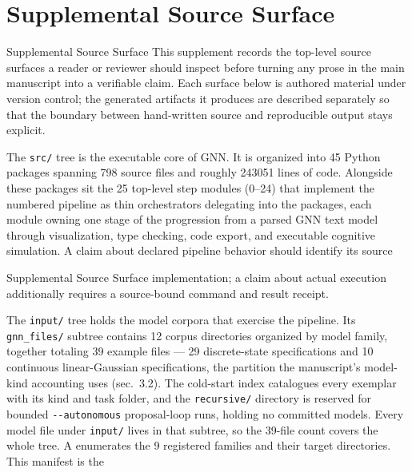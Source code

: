\documentclass[
  ignorenonframetext,
]{beamer}
\author{\texorpdfstring{}{}}
\date{}
\begin{document}
\section{Supplemental Source Surface}\label{sec:source_surface}

\begin{frame}{Supplemental Source Surface}
This supplement records the top-level source surfaces a reader or
reviewer should inspect before turning any prose in the main manuscript
into a verifiable claim. Each surface below is authored material under
version control; the generated artifacts it produces are described
separately so that the boundary between hand-written source and
reproducible output stays explicit.

The \texttt{src/} tree is the executable core of GNN. It is organized
into 45 Python packages spanning 798 source files and roughly 243051
lines of code. Alongside these packages sit the 25 top-level step
modules (0--24) that implement the numbered pipeline as thin
orchestrators delegating into the packages, each module owning one stage
of the progression from a parsed GNN text model through visualization,
type checking, code export, and executable cognitive simulation. A claim
about declared pipeline behavior should identify its source
\end{frame}

\begin{frame}{Supplemental Source Surface}
implementation; a claim about actual execution additionally requires a
source-bound command and result receipt.

The \texttt{input/} tree holds the model corpora that exercise the
pipeline. Its \texttt{gnn\_files/} subtree contains 12 corpus
directories organized by model family, together totaling 39 example
files --- 29 discrete-state specifications and 10 continuous
linear-Gaussian specifications, the partition the manuscript's
model-kind accounting uses (sec.~3.2). The cold-start
index  catalogues every exemplar with
its kind and task folder, and the \texttt{recursive/} directory is
reserved for bounded \texttt{-\/-autonomous} proposal-loop runs, holding
no committed models. Every model file under \texttt{input/} lives in
that subtree, so the 39-file count covers the whole tree. A
 enumerates the 9 registered
families and their target directories. This manifest is the
\end{frame}
\end{document}
